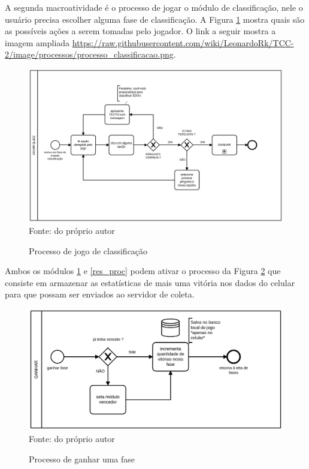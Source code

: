 A segunda macro\-atividade é o processo de jogar o módulo de classificação, nele o usuário precisa escolher alguma fase de classificação. A Figura \ref{class_proc} mostra quais são as possíveis ações a serem tomadas pelo jogador. O link a seguir mostra a imagem ampliada \url{https://raw.githubusercontent.com/wiki/LeonardoRk/TCC-2/image/processos/processo_classificacao.png}.  


\begin{figure}[H]
\centering
\caption{Processo de jogo de classificação}
\includegraphics[scale=0.15]{figuras/processos/processo_classificacao.png}
\label{class_proc}
\small{Fonte: do próprio autor}
\end{figure}

Ambos os módulos \ref{class_proc} e \ref{res_proc} podem ativar o processo da Figura \ref{ganhar_proc} que consiste em armazenar as estatísticas de mais uma vitória nos dados do celular para que possam ser enviados ao servidor de coleta.


\begin{figure}[H]
\centering
\caption{Processo de ganhar uma fase}
\includegraphics[scale=0.23]{figuras/processos/processo_ganhar.png}
\label{ganhar_proc}
\small{Fonte: do próprio autor}
\end{figure}

